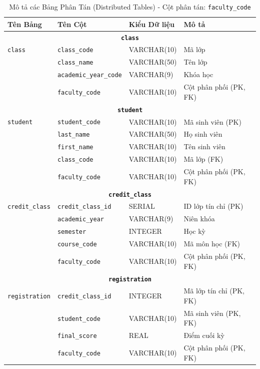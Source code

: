 \documentclass[conference]{IEEEtran}
\begin{document}
\begin{table}[htbp]
\caption{Mô tả các Bảng Phân Tán (Distributed Tables) - Cột phân tán: \texttt{faculty\_code}}
\label{tab:distributed_tables}
\centering
\begin{tabular}{|l|l|l|p{5cm}|}
\hline
\textbf{Tên Bảng} & \textbf{Tên Cột} & \textbf{Kiểu Dữ liệu} & \textbf{Mô tả} \\
\hline
\multicolumn{4}{|c|}{\textbf{\texttt{class}}} \\
\hline
\texttt{class} & \texttt{class\_code} & VARCHAR(10) & Mã lớp \\
               & \texttt{class\_name} & VARCHAR(50) & Tên lớp \\
               & \texttt{academic\_year\_code} & VARCHAR(9) & Khóa học \\
               & \texttt{faculty\_code} & VARCHAR(10) & Cột phân phối (PK, FK) \\
\hline
\multicolumn{4}{|c|}{\textbf{\texttt{student}}} \\
\hline
\texttt{student} & \texttt{student\_code} & VARCHAR(10) & Mã sinh viên (PK) \\
                 & \texttt{last\_name} & VARCHAR(50) & Họ sinh viên \\
                 & \texttt{first\_name} & VARCHAR(10) & Tên sinh viên \\
                 & \texttt{class\_code} & VARCHAR(10) & Mã lớp (FK) \\
                 & \texttt{faculty\_code} & VARCHAR(10) & Cột phân phối (PK, FK) \\
\hline
\multicolumn{4}{|c|}{\textbf{\texttt{credit\_class}}} \\
\hline
\texttt{credit\_class} & \texttt{credit\_class\_id} & SERIAL & ID lớp tín chỉ (PK) \\
                      & \texttt{academic\_year} & VARCHAR(9) & Niên khóa \\
                      & \texttt{semester} & INTEGER & Học kỳ \\
                      & \texttt{course\_code} & VARCHAR(10) & Mã môn học (FK) \\
                      & \texttt{faculty\_code} & VARCHAR(10) & Cột phân phối (PK, FK) \\
\hline
\multicolumn{4}{|c|}{\textbf{\texttt{registration}}} \\
\hline
\texttt{registration} & \texttt{credit\_class\_id} & INTEGER & Mã lớp tín chỉ (PK, FK) \\
                      & \texttt{student\_code} & VARCHAR(10) & Mã sinh viên (PK, FK) \\
                      & \texttt{final\_score} & REAL & Điểm cuối kỳ \\
                      & \texttt{faculty\_code} & VARCHAR(10) & Cột phân phối (PK, FK) \\
\hline
\end{tabular}
\end{table}
\end{document}
